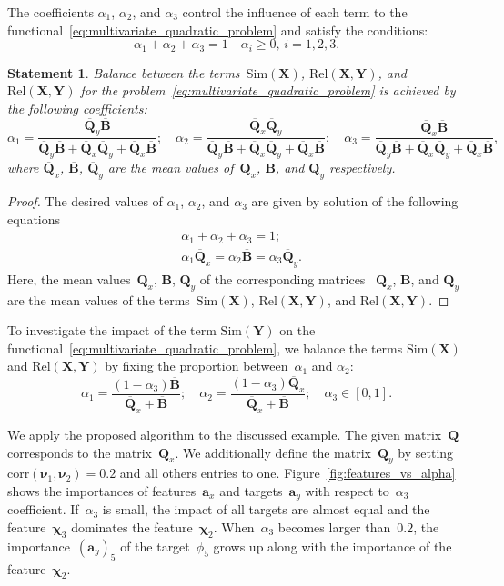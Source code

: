 \documentclass[12pt,twoside]{article}
\newtheorem{statement}{Statement}
\newcommand{\ba}{\mathbf{a}}
\newcommand{\bY}{\mathbf{Y}}
\newcommand{\bX}{\mathbf{X}}
\newcommand{\bB}{\mathbf{B}}
\newcommand{\bQ}{\mathbf{Q}}
\newcommand{\bchi}{\boldsymbol{\chi}}
\newcommand{\bnu}{\boldsymbol{\nu}}
\begin{document}
The coefficients $\alpha_1$, $\alpha_2$, and $\alpha_3$ control the influence of each term to the functional~\eqref{eq:multivariate_quadratic_problem} and satisfy the conditions:
\[
\alpha_1 + \alpha_2 + \alpha_3 = 1 \quad \alpha_i \geq 0, \, i = 1, 2, 3.
\] 
\begin{statement}
	Balance between the terms~$\text{Sim}(\bX)$, $\text{Rel}(\bX, \bY)$, and $\text{Rel}(\bX, \bY)$ for the problem~\eqref{eq:multivariate_quadratic_problem} is achieved by the following coefficients:
	\[
	\alpha_1 = \frac{\overline{\bQ}_y \overline{\bB} }{\overline{\bQ}_y \overline{\bB} + \overline{\bQ}_x \overline{\bQ}_y + \overline{\bQ}_x \overline{\bB}}; \quad
	\alpha_2 = \frac{\overline{\bQ}_x \overline{\bQ}_y}{\overline{\bQ}_y \overline{\bB} + \overline{\bQ}_x \overline{\bQ}_y + \overline{\bQ}_x \overline{\bB}}; \quad
	\alpha_3  = \frac{\overline{\bQ}_x \overline{\bB}}{\overline{\bQ}_y \overline{\bB} + \overline{\bQ}_x \overline{\bQ}_y + \overline{\bQ}_x \overline{\bB}},
	\]
	where $\overline{\bQ}_x$, $\overline{\bB}$, $\overline{\bQ}_y$ are the mean values of~$\bQ_x$, $\bB$, and $\bQ_y$ respectively.
	
\end{statement}
\begin{proof}
	The desired values of $\alpha_1$, $\alpha_2$, and $\alpha_3$ are given by solution of the following equations
	\begin{align*}
		&\alpha_1 + \alpha_2 + \alpha_3 = 1; \\
		&\alpha_1 \overline{\bQ}_x = \alpha_2 \overline{\bB} = \alpha_3 \overline{\bQ}_y.
	\end{align*}
	Here, the mean values~$\overline{\bQ}_x$, $\overline{\bB}$, $\overline{\bQ}_y$ of the corresponding matrices ~$\bQ_x$, $\bB$, and $\bQ_y$ are the mean values of the terms~$\text{Sim}(\bX)$, $\text{Rel}(\bX, \bY)$, and $\text{Rel}(\bX, \bY)$.
\end{proof}
To investigate the impact of the term $\text{Sim}(\bY)$ on the functional~\eqref{eq:multivariate_quadratic_problem}, we balance the terms $\text{Sim}(\bX)$ and $\text{Rel}(\bX, \bY)$ by fixing the proportion between~$\alpha_1$ and $\alpha_2$:
\begin{equation}
\alpha_1 = \frac{(1 - \alpha_3)\overline{\bB}}{\overline{\bQ}_x + \overline{\bB}}; \quad
\alpha_2 = \frac{(1 - \alpha_3)\overline{\bQ}_x}{\overline{\bQ}_x + \overline{\bB}}; \quad
\alpha_3 \in [0, 1].
\label{eq:alphas3}
\end{equation}

We apply the proposed algorithm to the discussed example.
The given matrix~$\bQ$ corresponds to the matrix~$\bQ_x$. 
We additionally define the matrix~$\bQ_y$ by setting $\text{corr}(\bnu_1, \bnu_2) = 0.2$ and all others entries to one. 
Figure~\ref{fig:features_vs_alpha} shows the importances of features~$\ba_x$ and targets~$\ba_y$ with respect to~$\alpha_3$ coefficient. 
If~$\alpha_3$ is small, the impact of all targets are almost equal and the feature~$\bchi_3$ dominates the feature~$\bchi_2$. When~$\alpha_3$ becomes larger than~$0.2$, the importance~$(\ba_y)_5$ of the target~$\phi_5$ grows up along with the importance of the feature~$\bchi_2$. 
\end{document}
